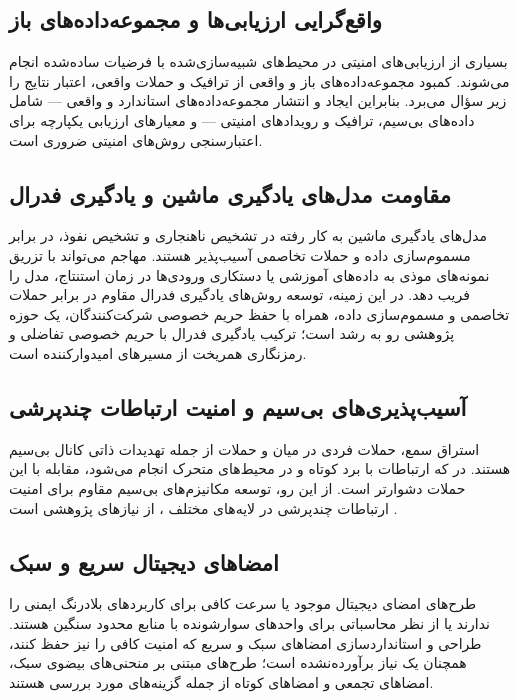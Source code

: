 \documentclass[12pt,a4paper]{article}
\begin{document}
\subsection{واقع‌گرایی ارزیابی‌ها و مجموعه‌داده‌های باز}
بسیاری از ارزیابی‌های امنیتی در محیط‌های شبیه‌سازی‌شده با فرضیات ساده‌شده انجام می‌شوند. کمبود مجموعه‌داده‌های باز و واقعی از ترافیک  و حملات واقعی، اعتبار نتایج را زیر سؤال می‌برد. بنابراین ایجاد و انتشار مجموعه‌داده‌های استاندارد و واقعی — شامل داده‌های بی‌سیم، ترافیک  و رویدادهای امنیتی — و معیارهای ارزیابی یکپارچه برای اعتبارسنجی روش‌های امنیتی ضروری است.

\subsection{مقاومت مدل‌های یادگیری ماشین و یادگیری فدرال}
مدل‌های یادگیری ماشین به کار رفته در تشخیص ناهنجاری و تشخیص نفوذ، در برابر مسموم‌سازی داده و حملات تخاصمی آسیب‌پذیر هستند. مهاجم می‌تواند با تزریق نمونه‌های موذی به داده‌های آموزشی یا دستکاری ورودی‌ها در زمان استنتاج، مدل را فریب دهد. در این زمینه، توسعه روش‌های یادگیری فدرال مقاوم در برابر حملات تخاصمی و مسموم‌سازی داده، همراه با حفظ حریم خصوصی شرکت‌کنندگان، یک حوزه پژوهشی رو به رشد است؛ ترکیب یادگیری فدرال با حریم خصوصی تفاضلی و رمزنگاری همریخت از مسیرهای امیدوارکننده است.

\subsection{آسیب‌پذیری‌های بی‌سیم و امنیت ارتباطات چندپرشی}
استراق سمع، حملات فردی در میان و حملات  از جمله تهدیدات ذاتی کانال بی‌سیم هستند. در  که ارتباطات با برد کوتاه و در محیط‌های متحرک انجام می‌شود، مقابله با این حملات دشوارتر است. از این رو، توسعه مکانیزم‌های بی‌سیم مقاوم برای امنیت ارتباطات چندپرشی در لایه‌های مختلف ، از نیازهای پژوهشی است \cite{VanetSecurityPrivacy}.

\subsection{امضاهای دیجیتال سریع و سبک}
طرح‌های امضای دیجیتال موجود یا سرعت کافی برای کاربردهای بلادرنگ ایمنی را ندارند یا از نظر محاسباتی برای واحدهای سوارشونده با منابع محدود سنگین هستند. طراحی و استانداردسازی امضاهای سبک و سریع که امنیت کافی را نیز حفظ کنند، همچنان یک نیاز برآورده‌نشده است؛ طرح‌های مبتنی بر منحنی‌های بیضوی سبک، امضاهای تجمعی و امضاهای کوتاه از جمله گزینه‌های مورد بررسی هستند.
\end{document}

